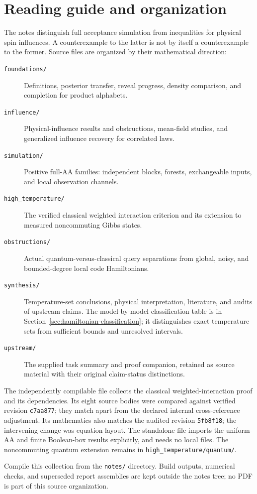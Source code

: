 \section*{Reading guide and organization}

The notes distinguish full acceptance simulation from inequalities for
physical spin influences. A counterexample to the latter is not by itself
a counterexample to the former. Source files are organized by their
mathematical direction:
\begin{description}
\item[\texttt{foundations/}] Definitions, posterior transfer, reveal
progress, density comparison, and completion for product alphabets.
\item[\texttt{influence/}] Physical-influence results and obstructions,
mean-field studies, and generalized influence recovery for correlated laws.
\item[\texttt{simulation/}] Positive full-AA families: independent
blocks, forests, exchangeable inputs, and local observation channels.
\item[\texttt{high\_temperature/}] The verified classical weighted
interaction criterion and its extension to measured noncommuting Gibbs
states.
\item[\texttt{obstructions/}] Actual quantum-versus-classical query
separations from global, noisy, and bounded-degree local code Hamiltonians.
\item[\texttt{synthesis/}] Temperature-set conclusions, physical
interpretation, literature, and audits of upstream claims.
The model-by-model classification table is in
Section~\ref{sec:hamiltonian-classification}; it distinguishes exact
temperature sets from sufficient bounds and unresolved intervals.
\item[\texttt{upstream/}] The supplied task summary and proof companion,
retained as source material with their original claim-status distinctions.
\end{description}

The independently compilable file
 collects the classical
weighted-interaction proof and its dependencies. Its eight source bodies
were compared against verified revision \texttt{c7aa877}; they match
apart from the declared internal cross-reference adjustment. Its
mathematics also matches the audited revision \texttt{5fb8f18}; the
intervening change was equation layout. The standalone file imports the
uniform-AA and finite Boolean-box results explicitly, and needs no local
\verb|| files. The noncommuting quantum extension remains in
\texttt{high\_temperature/quantum/}.

Compile this collection from the \texttt{notes/} directory. Build
outputs, numerical checks, and superseded report assemblies are kept
outside the notes tree; no PDF is part of this source organization.
